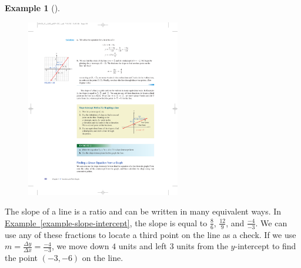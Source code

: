 \documentclass[10pt,]{book}
\theoremstyle{plain}
\theoremstyle{definition}
\theoremstyle{definition}
\newtheorem{example}[theorem]{Example}
\theoremstyle{definition}
\theoremstyle{definition}
\numberwithin{equation}{section}
\begin{document}
\begin{example}[]
\leavevmode%
\begin{figure}
\centering
\includegraphics[width=0.60\textwidth,]{images/fig-slope-intercept.pdf}\caption{\label{fig-slope-intercept}}
\end{figure}
\end{example}
\par
The slope of a line is a ratio and can be written in many equivalent ways. In \hyperref[example-slope-intercept]{Example~\ref{example-slope-intercept}}, the slope is equal to \(\frac{8}{6}\), \(\frac{12}{9}\), and \(\frac{−4}{−3}\). We can use any of these fractions to locate a third
point on the line as a check. If we use \(m = \frac{\Delta y}{\Delta x}= \frac{−4}{−3}\), we move down \(4\) units and left \(3\) units from the \(y\)-intercept to find the point \((−3, −6)\) on the line.%
\end{document}

